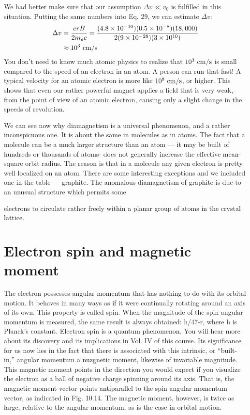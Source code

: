 We had better make sure that our assumption $\Delta v\ll v_0$ is fulfilled
in this situation. Putting the same numbers into Eq. 29, we can
estimate $\Delta v$:
\begin{align}
\begin{split}
  \Delta v &= \frac{erB}{2m_ec} = \frac{(4.8\times10^{-10})(0.5\times10^{-8})(18,000)}
                   {2(9\times10^{-28})(3\times10^{10})} \\
           &\approx 10^3\ \textup{cm}/\textup{s}
\end{split}
\end{align}
You don't need to know much atomic physics to realize that
$10^3\ \textup{cm}/\textup{s}$ is small compared to the speed of an electron in an atom.
A person can run that fast! A typical velocity for an atomic electron
is more like $10^8\ \textup{cm}/\textup{s}$, or higher. This shows that even our rather
powerful magnet applies a field that is very weak, from the point of
view of an atomic electron, causing only a slight change in the speeds
of revolution.


We can see now why diamagnetism is a universal phenomenon,
and a rather inconspicuous one. It is about the same in molecules
as in atoms. The fact that a molecule can be a much larger structure
than an atom --- it may be built of hundreds or thousands of atoms-
does not generally increase the effective mean-square orbit radius.
The reason is that in a molecule any given electron is pretty well
localized on an atom. There are some interesting exceptions and
we included one in the table --- graphite. The anomalous 
diamagnetism of graphite is due to an unusual structure which permits some

electrons to circulate rather freely within a planar group of atoms
in the crystal lattice.

\iffalse

\section{Electron spin and magnetic moment}

The electron possesses angular momentum that has nothing to
do with its orbital motion. It behaves in many ways as if it were
continually rotating around an axis of its own. This property is
called spin. When the magnitude of the spin angular momentum
is measured, the same result is always obtained: h/47-r, where h is
Planck's constant. Electron spin is a quantum phenomenon. You
will hear more about its discovery and its implications in Vol. IV of
this course. Its significance for us now lies in the fact that there is
associated with this intrinsic, or ``built-in,'' angular momentum a
nuzgnetic moment, likewise of invariable magnitude. This magnetic
moment points in the direction you would expect if you visualize
the electron as a ball of negative charge spinning around its axis.
That is, the magnetic moment vector points antiparallel to the spin
angular momentum vector, as indicated in Fig. 10.14. The magnetic
moment, however, is twice as large, relative to the angular 
momentum, as is the case in orbital motion.


